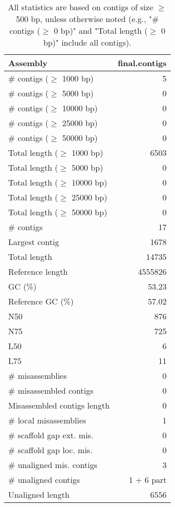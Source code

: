 \documentclass[12pt,a4paper]{article}
\begin{document}
\begin{table}[ht]
\begin{center}
\caption{All statistics are based on contigs of size $\geq$ 500 bp, unless otherwise noted (e.g., "\# contigs ($\geq$ 0 bp)" and "Total length ($\geq$ 0 bp)" include all contigs).}
\begin{tabular}{|l*{1}{|r}|}
\hline
Assembly & final.contigs \\ \hline
\# contigs ($\geq$ 1000 bp) & 5 \\ \hline
\# contigs ($\geq$ 5000 bp) & 0 \\ \hline
\# contigs ($\geq$ 10000 bp) & 0 \\ \hline
\# contigs ($\geq$ 25000 bp) & 0 \\ \hline
\# contigs ($\geq$ 50000 bp) & 0 \\ \hline
Total length ($\geq$ 1000 bp) & 6503 \\ \hline
Total length ($\geq$ 5000 bp) & 0 \\ \hline
Total length ($\geq$ 10000 bp) & 0 \\ \hline
Total length ($\geq$ 25000 bp) & 0 \\ \hline
Total length ($\geq$ 50000 bp) & 0 \\ \hline
\# contigs & 17 \\ \hline
Largest contig & 1678 \\ \hline
Total length & 14735 \\ \hline
Reference length & 4555826 \\ \hline
GC (\%) & 53.23 \\ \hline
Reference GC (\%) & 57.02 \\ \hline
N50 & 876 \\ \hline
N75 & 725 \\ \hline
L50 & 6 \\ \hline
L75 & 11 \\ \hline
\# misassemblies & 0 \\ \hline
\# misassembled contigs & 0 \\ \hline
Misassembled contigs length & 0 \\ \hline
\# local misassemblies & 1 \\ \hline
\# scaffold gap ext. mis. & 0 \\ \hline
\# scaffold gap loc. mis. & 0 \\ \hline
\# unaligned mis. contigs & 3 \\ \hline
\# unaligned contigs & 1 + 6 part \\ \hline
Unaligned length & 6556 \\ \hline

\end{tabular}
\end{center}
\end{table}
\end{document}

